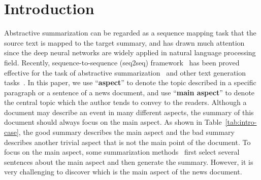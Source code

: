 \documentclass[letterpaper]{article} \usepackage{aaai19}  \usepackage{times}  \usepackage{helvet}  \usepackage{courier}
\begin{document}
    \section{Introduction}

Abstractive summarization can be regarded as a sequence mapping task that the source text is mapped to the target summary, and has drawn much attention since the deep neural networks are widely applied in natural language processing field.
Recently, sequence-to-sequence (seq2seq) framework~\cite{Sutskever2014SequenceTS} has been proved effective for the task of abstractive summarization~\cite{Chopra2016AbstractiveSS,see2017get} and other text generation tasks~\cite{Tao2018GetTP,Gao2019Product}.
In this paper, we use ``\textbf{aspect}'' to denote the topic described in a specific paragraph or a sentence of a news document, and use ``\textbf{main aspect}'' to denote the central topic which the author tends to convey to the readers.
Although a document may describe an event in many different aspects, the summary of this document should always focus on the main aspect.
As shown in Table~\ref{tab:intro-case}, the good summary describes the main aspect and the bad summary describes another trivial aspect that is not the main point of the document.
To focus on the main aspect, some summarization methods~\cite{Sun2018AUM,Zhou2017SelectiveEF,Bansal2018FastAS} first select several sentences about the main aspect and then generate the summary.
However, it is very challenging to discover which is the main aspect of the news document.
\end{document}

